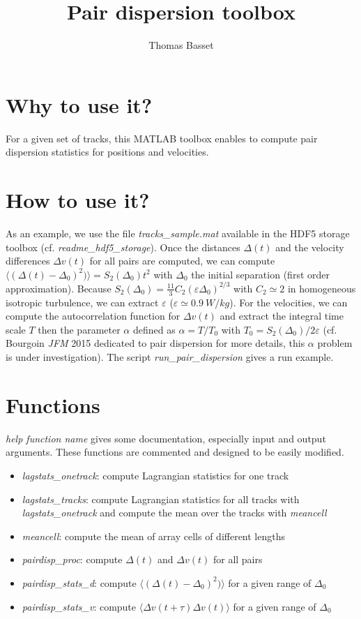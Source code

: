 \documentclass{article}
\title{Pair dispersion toolbox}
\author{Thomas Basset}
\begin{document}
\maketitle

\section{Why to use it?}
For a given set of tracks, this MATLAB toolbox enables to compute pair dispersion statistics for positions and velocities.

\section{How to use it?}
As an example, we use the file \textit{tracks\_sample.mat} available in the HDF5 storage toolbox (cf. \textit{readme\_hdf5\_storage}). Once the distances $\Delta(t)$ and the velocity differences $\Delta v(t)$ for all pairs are computed, we can compute $\langle (\Delta(t) - \Delta_0)^2) \rangle = S_2(\Delta_0) t^2$ with $\Delta_0$ the initial separation (first order approximation). Because $S_2(\Delta_0) = \frac{11}{3} C_2 (\varepsilon \Delta_0)^{2/3}$ with $C_2 \simeq 2$ in homogeneous isotropic turbulence, we can extract $\varepsilon$ ($\varepsilon \simeq \SI{0.9}{W/kg}$). For the velocities, we can compute the autocorrelation function for $\Delta v(t)$ and extract the integral time scale $T$ then the parameter $\alpha$ defined as $\alpha = T / T_0$ with $T_0 = S_2(\Delta_0)/2\varepsilon$ (cf. Bourgoin \textit{JFM} 2015 dedicated to pair dispersion for more details, this $\alpha$ problem is under investigation). The script \textit{run\_pair\_dispersion} gives a run example.

\section{Functions}
\textit{help function name} gives some documentation, especially input and output arguments. These functions are commented and designed to be easily modified.
\begin{itemize}
\item \textit{lagstats\_onetrack}: compute Lagrangian statistics for one track
\item \textit{lagstats\_tracks}: compute Lagrangian statistics for all tracks with \textit{lagstats\_onetrack} and compute the mean over the tracks with \textit{meancell}
\item \textit{meancell}: compute the mean of array cells of different lengths
\item \textit{pairdisp\_proc}: compute $\Delta(t)$ and $\Delta v(t)$ for all pairs
\item \textit{pairdisp\_stats\_d}: compute $\langle (\Delta(t) - \Delta_0)^2) \rangle$ for a given range of $\Delta_0$
\item \textit{pairdisp\_stats\_v}: compute $\langle \Delta v(t+\tau) \Delta v(t) \rangle$ for a given range of $\Delta_0$
\end{itemize}
\end{document}
